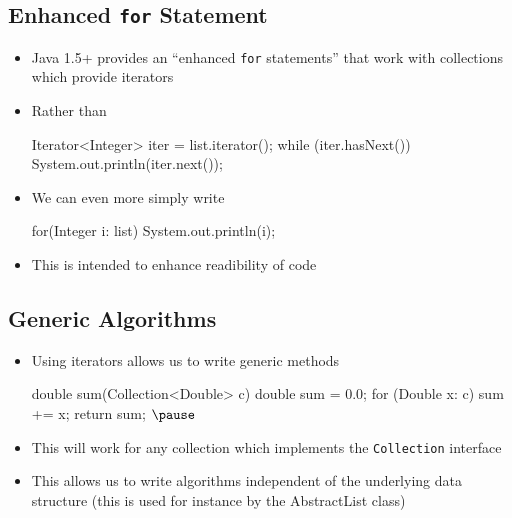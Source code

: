 \begin{slide}
\section[-1]{Enhanced \texttt{for} Statement}

\begin{PauseHighLight}
  \begin{itemize}
  \item Java 1.5+ provides an ``enhanced \texttt{for} statements'' that
    work with collections which provide iterators\pause
  \item Rather than
    \begin{java}
        Iterator<Integer> iter = list.iterator();
        while (iter.hasNext())
            System.out.println(iter.next());      
    \end{java}\pause\vspace{-1cm}
  \item We can even more simply write
    \begin{java}
        for(Integer i: list)
            System.out.println(i);
    \end{java}\pause\vspace{-1cm}
  \item This is intended to enhance readibility of code\pause
  \end{itemize}
\end{PauseHighLight}

\end{slide}


\begin{slide}
\section[-1]{Generic Algorithms}

\begin{PauseHighLight}
  \begin{itemize}
  \item Using iterators allows us to write generic methods
    \begin{java}
      double sum(Collection<Double> c)
      {
        double sum = 0.0;
        for (Double x: c)
            sum += x;
        return sum;
      }$\pause$
    \end{java}\vspace{-1cm}
  \item This will work for any collection which implements the
    \texttt{Collection} interface\pause
  \item This allows us to write algorithms independent of the underlying
    data structure (this is used for instance by the AbstractList
    class)\pause
  \end{itemize}
\end{PauseHighLight}
\end{slide}

